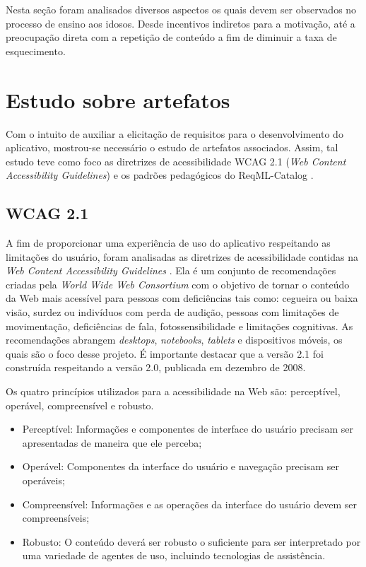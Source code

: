 Nesta seção foram analisados diversos aspectos os quais devem ser observados no processo de ensino aos idosos. Desde incentivos indiretos para a motivação, até a preocupação direta com a repetição de conteúdo a fim de diminuir a taxa de esquecimento. 

\section{Estudo sobre artefatos}
\label{subsec:artefatos}
Com o intuito de auxiliar a elicitação de requisitos para o desenvolvimento do aplicativo, mostrou-se necessário o estudo de artefatos associados.
Assim, tal estudo teve como foco as diretrizes de acessibilidade WCAG 2.1 (\textit{Web Content Accessibility Guidelines}) e os padrões pedagógicos do ReqML-Catalog \citep{soad2017reqml}.

\subsection{WCAG 2.1}
A fim de proporcionar uma experiência de uso do aplicativo respeitando as limitações do usuário, foram analisadas as diretrizes de acessibilidade contidas na \textit{Web Content Accessibility Guidelines} \citep{wcag}. Ela é um conjunto de recomendações criadas pela
\textit{World Wide Web Consortium} \citep{w3c} com o objetivo de tornar o conteúdo da Web mais acessível para pessoas com deficiências tais como: cegueira ou baixa visão, surdez ou indivíduos com perda de audição, pessoas com limitações de movimentação, deficiências de fala, fotossensibilidade e limitações cognitivas. As recomendações abrangem \textit{desktops}, \textit{notebooks}, \textit{tablets} e dispositivos móveis, os quais são o foco desse projeto. É importante destacar que a versão 2.1 foi construída respeitando a versão 2.0, publicada em dezembro de 2008. %

Os quatro princípios utilizados para a acessibilidade na Web são: perceptível, operável, compreensível e robusto.
\begin{itemize}
    \item Perceptível: Informações e componentes de interface do usuário precisam ser apresentadas de maneira que ele perceba;
    \item Operável: Componentes da interface do usuário e navegação precisam ser operáveis;
    \item Compreensível: Informações e as operações da interface do usuário devem ser compreensíveis;
    \item Robusto: O conteúdo deverá ser robusto o suficiente para ser interpretado por uma variedade de agentes de uso, incluindo tecnologias de assistência.
\end{itemize}

